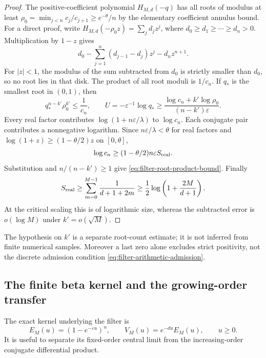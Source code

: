 \documentclass[11pt]{article}
\theoremstyle{definition}
\theoremstyle{remark}
\begin{document}
\begin{proof}
The positive-coefficient polynomial $H_{M,d}(-q)$ has all roots of
modulus at least
$\rho_0=\min_{j<n}c_j/c_{j+1}\ge e^{-\theta}/n$ by the elementary
coefficient annulus bound.  For a direct proof, write
$H_{M,d}(-\rho_0 z)=\sum_j d_jz^j$, where
$d_0\ge d_1\ge\cdots\ge d_n>0$.  Multiplication by $1-z$
gives
\[
 d_0-\sum_{j=1}^n(d_{j-1}-d_j)z^j-d_nz^{n+1}.
\]
For $|z|<1$, the modulus of the sum subtracted from $d_0$ is
strictly smaller than $d_0$, so no root lies in that disk.
The product of all root moduli is $1/c_n$.  If $q_*$ is the smallest
root in $(0,1)$, then
\[
 q_*^{n-k'}\rho_0^{k'}\le\frac1{c_n},\qquad
 U=-\varepsilon^{-1}\log q_*
 \ge\frac{\log c_n+k'\log\rho_0}{(n-k')\varepsilon}.
\]
Every real factor contributes $\log(1+n\varepsilon/\lambda)$ to
$\log c_n$.  Each conjugate pair contributes a nonnegative logarithm.
Since $n\varepsilon/\lambda<\theta$ for real factors and
$\log(1+z)\ge(1-\theta/2)z$ on $[0,\theta]$,
\[
 \log c_n\ge(1-\theta/2)n\varepsilon S_{\rm real}.
\]
Substitution and $n/(n-k')\ge1$ give
\eqref{eq:filter-root-product-bound}.  Finally
\[
 S_{\rm real}\ge\sum_{m=0}^{M-1}\frac1{d+1+2m}
 \ge\frac12\log\left(1+\frac{2M}{d+1}\right).
\]
At the critical scaling this is of logarithmic size, whereas the
subtracted error is $o(\log M)$ under $k'=o(\sqrt M)$.
\end{proof}

The hypothesis on $k'$ is a separate root-count estimate; it is not
inferred from finite numerical samples.  Moreover a last zero alone
excludes strict positivity, not the discrete admission condition
\eqref{eq:filter-arithmetic-admission}.

\subsection{The finite beta kernel and the growing-order transfer}
\label{subsec:filter-beta-transfer}

The exact kernel underlying the filter is
\begin{equation}
 E_M(u)=(1-e^{-\varepsilon u})^n,\qquad
 V_M(u)=e^{-du}E_M(u),\qquad u\ge0.
 \label{eq:filter-beta-kernel}
\end{equation}
It is useful to separate its fixed-order central limit from the
increasing-order conjugate differential product.
\end{document}
